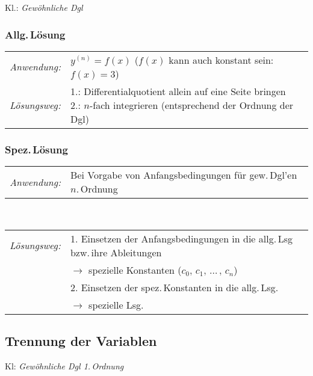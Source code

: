 \documentclass[a4paper,10pt,titlepage]{scrartcl}
\begin{document}
Kl.: \emph{Gewöhnliche Dgl}
\subsubsection*{Allg.\,Lösung}
\begin{tabular}{ll}
 \emph{Anwendung:}
&
 $y^{(n)}=f(x)$ \qquad ($f(x)$ kann auch konstant sein: $f(x)=3$)
\\
 \emph{Lösungsweg:}
&
 \parbox{10cm}{%
  1.: Differentialquotient allein auf eine Seite bringen\\
  2.: $n$-fach integrieren (entsprechend der Ordnung der Dgl)
 }
\\
\end{tabular}
\subsubsection*{Spez.\,Lösung}
\begin{tabular}{ll}
 \emph{Anwendung:}
&
 Bei Vorgabe von Anfangsbedingungen für gew.\,Dgl'en $n$.\,Ordnung
\\
\end{tabular}
\smallskip\\
\begin{tabular}{ll}
 \emph{Lösungsweg:}
& 1. Einsetzen der Anfangsbedingungen in die allg.\,Lsg bzw.\,ihre Ableitungen
\\
& $\to$ spezielle Konstanten ($c_0,\,c_1,\,\dots\,,\,c_n$)
\\
& 2. Einsetzen der spez.\,Konstanten in die allg.\,Lsg.
\\
& $\to$ spezielle Lsg.
\\
\end{tabular}


\subsection*{Trennung der Variablen}
\label{sec:trennung_der_variablen}

Kl: \emph{Gewöhnliche Dgl 1.\,Ordnung}
\end{document}
